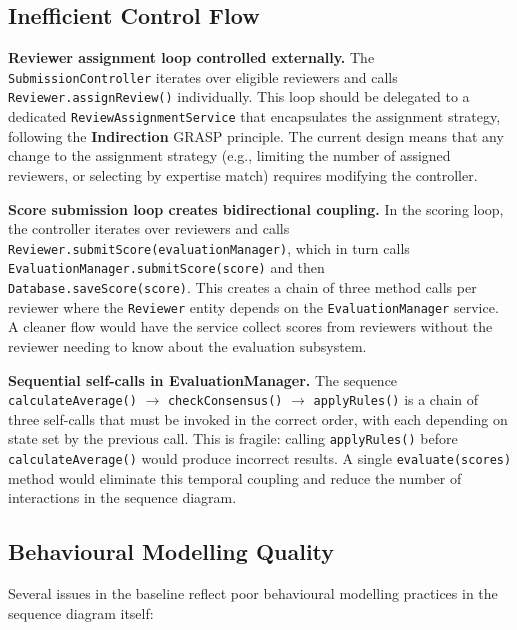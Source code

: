 \documentclass[12pt, a4paper]{article}
\begin{document}
\subsection{Inefficient Control Flow}

\textbf{Reviewer assignment loop controlled externally.}
The \texttt{SubmissionController} iterates over eligible reviewers and calls \texttt{Reviewer.assignReview()} individually. This loop should be delegated to a dedicated \texttt{ReviewAssignmentService} that encapsulates the assignment strategy, following the \textbf{Indirection} GRASP principle. The current design means that any change to the assignment strategy (e.g., limiting the number of assigned reviewers, or selecting by expertise match) requires modifying the controller.

\textbf{Score submission loop creates bidirectional coupling.}
In the scoring loop, the controller iterates over reviewers and calls \texttt{Reviewer.submitScore(evaluationManager)}, which in turn calls \texttt{EvaluationManager.submitScore(score)} and then \texttt{Database.saveScore(score)}. This creates a chain of three method calls per reviewer where the \texttt{Reviewer} entity depends on the \texttt{EvaluationManager} service. A cleaner flow would have the service collect scores from reviewers without the reviewer needing to know about the evaluation subsystem.

\textbf{Sequential self-calls in EvaluationManager.}
The sequence \texttt{calculateAverage()} $\rightarrow$ \texttt{checkConsensus()} $\rightarrow$ \texttt{applyRules()} is a chain of three self-calls that must be invoked in the correct order, with each depending on state set by the previous call. This is fragile: calling \texttt{applyRules()} before \texttt{calculateAverage()} would produce incorrect results. A single \texttt{evaluate(scores)} method would eliminate this temporal coupling and reduce the number of interactions in the sequence diagram.

\subsection{Behavioural Modelling Quality}

Several issues in the baseline reflect poor behavioural modelling practices in the sequence diagram itself:
\end{document}
